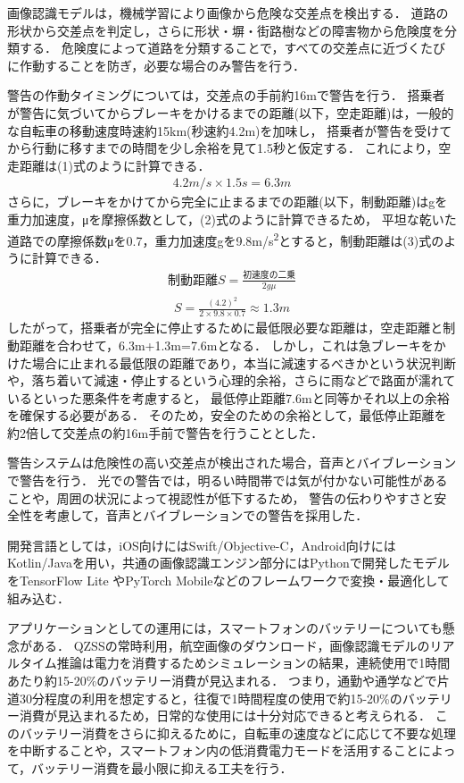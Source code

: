 \documentclass[uplatex,dvipdfmx]{jsarticle}
\begin{document}
画像認識モデルは，機械学習により画像から危険な交差点を検出する．
道路の形状から交差点を判定し，さらに形状・塀・街路樹などの障害物から危険度を分類する．
危険度によって道路を分類することで，すべての交差点に近づくたびに作動することを防ぎ，必要な場合のみ警告を行う．

警告の作動タイミングについては，交差点の手前約16mで警告を行う．
搭乗者が警告に気づいてからブレーキをかけるまでの距離(以下，空走距離)は，一般的な自転車の移動速度時速約15km(秒速約4.2m)を加味し，
搭乗者が警告を受けてから行動に移すまでの時間を少し余裕を見て1.5秒と仮定する\cite{ref:bycicle, ref:responsibility}．
これにより，空走距離は(1)式のように計算できる．
\begin{align}
4.2m/s×1.5s=6.3m
\end{align}
さらに，ブレーキをかけてから完全に止まるまでの距離(以下，制動距離)はgを重力加速度，μを摩擦係数として，(2)式のように計算できるため，
平坦な乾いた道路での摩擦係数μを0.7，重力加速度gを9.8m/s\textsuperscript{2}とすると，制動距離は(3)式のように計算できる\cite{ref:brake_distance,ref:dry_road}．
\begin{align}
  制動距離S = \frac{初速度の二乗}{2g\mu}
\end{align}
\begin{align}
  S = \frac{(4.2)^2}{2×9.8×0.7} ≈ 1.3m
\end{align}
したがって，搭乗者が完全に停止するために最低限必要な距離は，空走距離と制動距離を合わせて，6.3m+1.3m=7.6mとなる．
しかし，これは急ブレーキをかけた場合に止まれる最低限の距離であり，本当に減速するべきかという状況判断や，落ち着いて減速・停止するという心理的余裕，さらに雨などで路面が濡れているといった悪条件を考慮すると，
最低停止距離7.6mと同等かそれ以上の余裕を確保する必要がある．
そのため，安全のための余裕として，最低停止距離を約2倍して交差点の約16m手前で警告を行うこととした．

警告システムは危険性の高い交差点が検出された場合，音声とバイブレーションで警告を行う．
光での警告では，明るい時間帯では気が付かない可能性があることや，周囲の状況によって視認性が低下するため，
警告の伝わりやすさと安全性を考慮して，音声とバイブレーションでの警告を採用した．

開発言語としては，iOS向けにはSwift/Objective-C，Android向けにはKotlin/Javaを用い，共通の画像認識エンジン部分にはPythonで開発したモデルをTensorFlow Lite やPyTorch
Mobileなどのフレームワークで変換・最適化して組み込む．

アプリケーションとしての運用には，スマートフォンのバッテリーについても懸念がある．
QZSSの常時利用，航空画像のダウンロード，画像認識モデルのリアルタイム推論は電力を消費するためシミュレーションの結果，連続使用で1時間あたり約15-20\%のバッテリー消費が見込まれる．
つまり，通勤や通学などで片道30分程度の利用を想定すると，往復で1時間程度の使用で約15-20\%のバッテリー消費が見込まれるため，日常的な使用には十分対応できると考えられる．
このバッテリー消費をさらに抑えるために，自転車の速度などに応じて不要な処理を中断することや，スマートフォン内の低消費電力モードを活用することによって，バッテリー消費を最小限に抑える工夫を行う．
\end{document}
